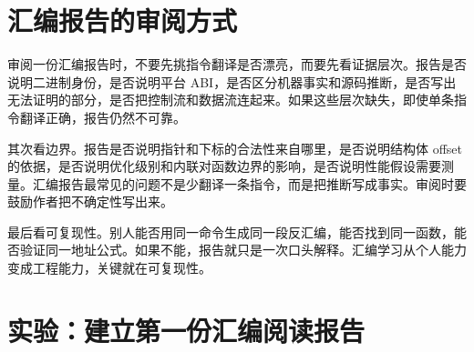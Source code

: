 \section{汇编报告的审阅方式}

审阅一份汇编报告时，不要先挑指令翻译是否漂亮，而要先看证据层次。报告是否说明二进制身份，是否说明平台 ABI，是否区分机器事实和源码推断，是否写出无法证明的部分，是否把控制流和数据流连起来。如果这些层次缺失，即使单条指令翻译正确，报告仍然不可靠。

其次看边界。报告是否说明指针和下标的合法性来自哪里，是否说明结构体 offset 的依据，是否说明优化级别和内联对函数边界的影响，是否说明性能假设需要测量。汇编报告最常见的问题不是少翻译一条指令，而是把推断写成事实。审阅时要鼓励作者把不确定性写出来。

最后看可复现性。别人能否用同一命令生成同一段反汇编，能否找到同一函数，能否验证同一地址公式。如果不能，报告就只是一次口头解释。汇编学习从个人能力变成工程能力，关键就在可复现性。

\section{实验：建立第一份汇编阅读报告}

